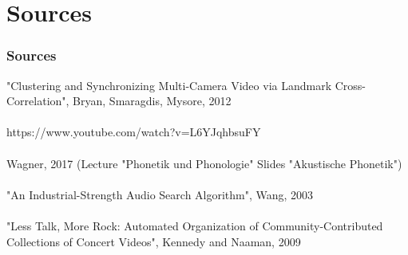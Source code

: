 \documentclass{beamer}
\begin{document}
\section{Sources}
\begin{frame}
\frametitle{Sources}

"Clustering and Synchronizing Multi-Camera Video via Landmark Cross-Correlation", Bryan, Smaragdis, Mysore, 2012\\
\ \\
https://www.youtube.com/watch?v=L6YJqhbsuFY \\
\ \\
Wagner, 2017 (Lecture "Phonetik und Phonologie" Slides "Akustische Phonetik")\\
\ \\
"An Industrial-Strength Audio Search Algorithm", Wang, 2003\\
\ \\
"Less Talk, More Rock: Automated Organization of Community-Contributed Collections of Concert Videos", Kennedy and Naaman, 2009 \\
\ \\


\end{frame}










	 
\end{document}
